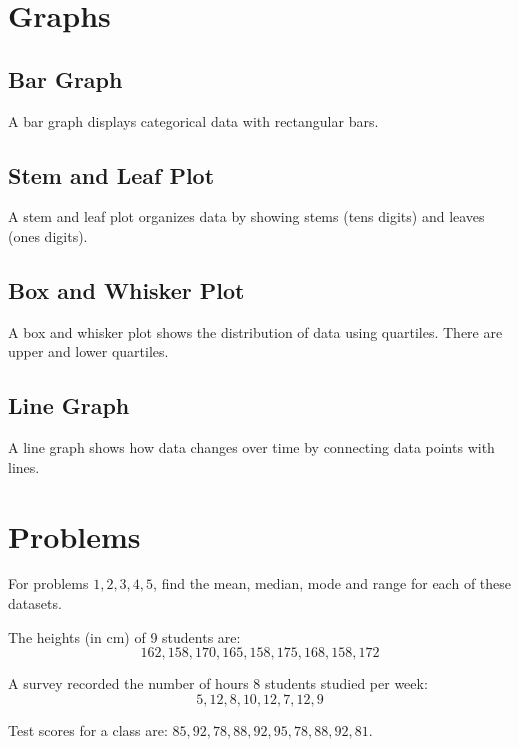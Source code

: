 \documentclass{article}
\theoremstyle{mytheoremstyle}
\theoremstyle{mytheoremstyle}
\theoremstyle{myproblemstyle}
\theoremstyle{myproblemstyle}
\begin{document}
    \section{Graphs}

    \subsection{Bar Graph}
    A bar graph displays categorical data with rectangular bars.

    \subsection{Stem and Leaf Plot}
    A stem and leaf plot organizes data by showing stems (tens digits) and leaves (ones digits).

    \subsection{Box and Whisker Plot}
    A box and whisker plot shows the distribution of data using quartiles. There are upper and lower quartiles.

    \subsection{Line Graph}
    A line graph shows how data changes over time by connecting data points with lines.

    \section{Problems}

    For problems $1, 2, 3, 4, 5$, find the mean, median, mode and range for each of these datasets.

    \begin{problem}
        The heights (in cm) of 9 students are: $$162, 158, 170, 165, 158, 175, 168, 158, 172$$

    \end{problem}

    \begin{problem}
        A survey recorded the number of hours 8 students studied per week: $$5, 12, 8, 10, 12, 7, 12, 9$$
    \end{problem}

    \begin{problem}
        Test scores for a class are: $85, 92, 78, 88, 92, 95, 78, 88, 92, 81$.
    \end{problem}
\end{document}
